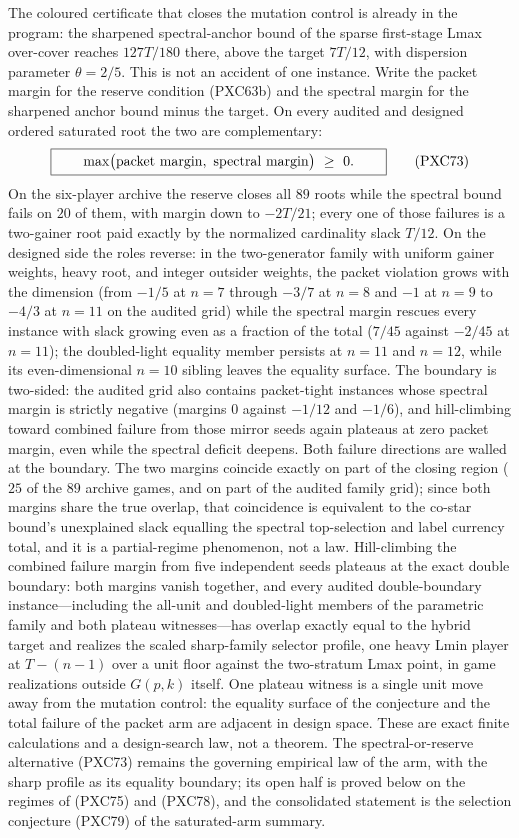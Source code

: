 \documentclass[11pt]{article}
\begin{document}
The coloured certificate that closes the mutation control is already in
the program: the sharpened spectral-anchor bound of the sparse first-stage
Lmax over-cover reaches $127T/180$ there, above the target $7T/12$, with
dispersion parameter $\theta=2/5$.  This is not an accident of one
instance.  Write the packet margin for the reserve condition (PXC63b) and
the spectral margin for the sharpened anchor bound minus the target.  On
every audited and designed ordered saturated root the two are
complementary:
\[
 \boxed{\qquad
 \max\bigl({\rm packet\ margin},\ {\rm spectral\ margin}\bigr)\ \ge\ 0.
 \qquad}                                             \tag{PXC73}
\]
On the six-player archive the reserve closes all $89$ roots while the
spectral bound fails on $20$ of them, with margin down to $-2T/21$; every
one of those failures is a two-gainer root paid exactly by the normalized
cardinality slack $T/12$.  On the designed side the roles reverse: in the
two-generator family with uniform gainer weights, heavy root, and integer
outsider weights, the packet violation grows with the dimension (from
$-1/5$ at $n=7$ through $-3/7$ at $n=8$ and $-1$ at $n=9$ to $-4/3$ at
$n=11$ on the audited grid) while the spectral margin rescues every
instance with slack growing even as a fraction of the total ($7/45$
against $-2/45$ at $n=11$); the doubled-light equality member persists at
$n=11$ and $n=12$, while its even-dimensional $n=10$ sibling leaves the
equality surface.  The boundary is two-sided: the audited grid also
contains packet-tight instances whose spectral margin is strictly
negative (margins $0$ against $-1/12$ and $-1/6$), and hill-climbing
toward combined failure from those mirror seeds again plateaus at zero
packet margin, even while the spectral deficit deepens.  Both failure
directions are walled at the boundary.  The two margins coincide exactly
on part of the closing region ($25$ of the $89$ archive games, and on
part of the audited family grid); since both margins share the true
overlap, that coincidence is equivalent to the co-star bound's
unexplained slack equalling the spectral top-selection and label currency
total, and it is a partial-regime phenomenon, not a law.
Hill-climbing the combined failure margin from five independent seeds
plateaus at the exact double boundary: both margins vanish together, and
every audited double-boundary instance---including the all-unit and
doubled-light members of the parametric family and both plateau
witnesses---has overlap exactly equal to the hybrid target and realizes
the scaled sharp-family selector profile, one heavy Lmin player at
$T-(n-1)$ over a unit floor against the two-stratum Lmax point, in game
realizations outside $G(p,k)$ itself.
One plateau witness is a single unit move away from the mutation control:
the equality surface of the conjecture and the total failure of the packet
arm are adjacent in design space.  These are exact finite calculations and
a design-search law, not a theorem.  The spectral-or-reserve alternative
(PXC73) remains the governing empirical law of the arm, with the sharp
profile as its equality boundary; its open half is proved below on the
regimes of (PXC75) and (PXC78), and the consolidated statement is the
selection conjecture (PXC79) of the saturated-arm summary.
\end{document}
